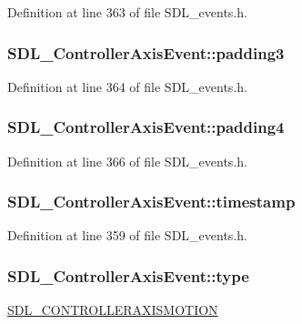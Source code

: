 Definition at line 363 of file S\-D\-L\-\_\-events.\-h.

\hypertarget{struct_s_d_l___controller_axis_event_ab82598fe5621dca9b1a41f7b2ca1e9a0}{
\subsubsection[{padding3}]{ S\-D\-L\-\_\-\-Controller\-Axis\-Event\-::padding3}}\label{struct_s_d_l___controller_axis_event_ab82598fe5621dca9b1a41f7b2ca1e9a0}


Definition at line 364 of file S\-D\-L\-\_\-events.\-h.

\hypertarget{struct_s_d_l___controller_axis_event_ae0ad0f279b9978bbbac9f5b22ae8020b}{
\subsubsection[{padding4}]{ S\-D\-L\-\_\-\-Controller\-Axis\-Event\-::padding4}}\label{struct_s_d_l___controller_axis_event_ae0ad0f279b9978bbbac9f5b22ae8020b}


Definition at line 366 of file S\-D\-L\-\_\-events.\-h.

\hypertarget{struct_s_d_l___controller_axis_event_afc92dba0b4d1652a1ecf9e85606d1f14}{
\subsubsection[{timestamp}]{ S\-D\-L\-\_\-\-Controller\-Axis\-Event\-::timestamp}}\label{struct_s_d_l___controller_axis_event_afc92dba0b4d1652a1ecf9e85606d1f14}


Definition at line 359 of file S\-D\-L\-\_\-events.\-h.

\hypertarget{struct_s_d_l___controller_axis_event_aa904b61e4763d28d887cf8afcc3cbb7c}{
\subsubsection[{type}]{ S\-D\-L\-\_\-\-Controller\-Axis\-Event\-::type}}\label{struct_s_d_l___controller_axis_event_aa904b61e4763d28d887cf8afcc3cbb7c}
\hyperlink{_s_d_l__events_8h_a3b589e89be6b35c02e0dd34a55f3fccaaca6330126f4126f6a45454fa046c25f3}{S\-D\-L\-\_\-\-C\-O\-N\-T\-R\-O\-L\-L\-E\-R\-A\-X\-I\-S\-M\-O\-T\-I\-O\-N} 

